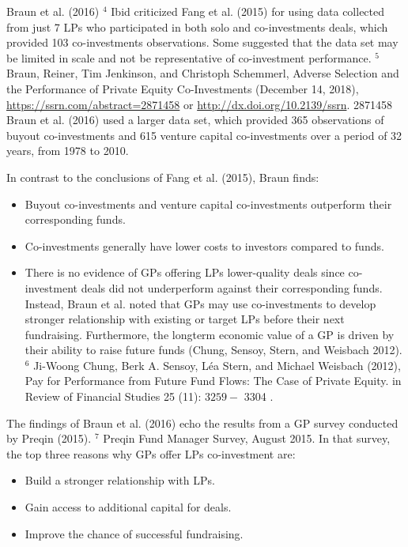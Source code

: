 \documentclass[11pt]{article}
\begin{document}
Braun et al. (2016) ${ }^{4}$ Ibid criticized Fang et al. (2015) for using data collected from just 7 LPs who participated in both solo and co-investments deals, which provided 103 co-investments observations. Some suggested that the data set may be limited in scale and not be representative of co-investment performance. ${ }^{5}$ Braun, Reiner, Tim Jenkinson, and Christoph Schemmerl, Adverse Selection and the Performance of Private Equity Co-Investments (December 14, 2018), \href{https://ssrn.com/abstract=2871458}{https://ssrn.com/abstract=2871458} or \href{http://dx.doi.org/10.2139/ssrn}{http://dx.doi.org/10.2139/ssrn}. 2871458 Braun et al. (2016) used a larger data set, which provided 365 observations of buyout co-investments and 615 venture capital co-investments over a period of 32 years, from 1978 to 2010.

In contrast to the conclusions of Fang et al. (2015), Braun finds:

\begin{itemize}
  \item Buyout co-investments and venture capital co-investments outperform their corresponding funds.
  \item Co-investments generally have lower costs to investors compared to funds.
  \item There is no evidence of GPs offering LPs lower-quality deals since co-investment deals did not underperform against their corresponding funds. Instead, Braun et al. noted that GPs may use co-investments to develop stronger relationship with existing or target LPs before their next fundraising. Furthermore, the longterm economic value of a GP is driven by their ability to raise future funds (Chung, Sensoy, Stern, and Weisbach 2012). ${ }^{6}$ Ji-Woong Chung, Berk A. Sensoy, Léa Stern, and Michael Weisbach (2012), Pay for Performance from Future Fund Flows: The Case of Private Equity. in Review of Financial Studies 25 (11): $3259-$ 3304 .
\end{itemize}

The findings of Braun et al. (2016) echo the results from a GP survey conducted by Preqin (2015). ${ }^{7}$ Preqin Fund Manager Survey, August 2015. In that survey, the top three reasons why GPs offer LPs co-investment are:

\begin{itemize}
  \item Build a stronger relationship with LPs.
  \item Gain access to additional capital for deals.
  \item Improve the chance of successful fundraising.
\end{itemize}
\end{document}
